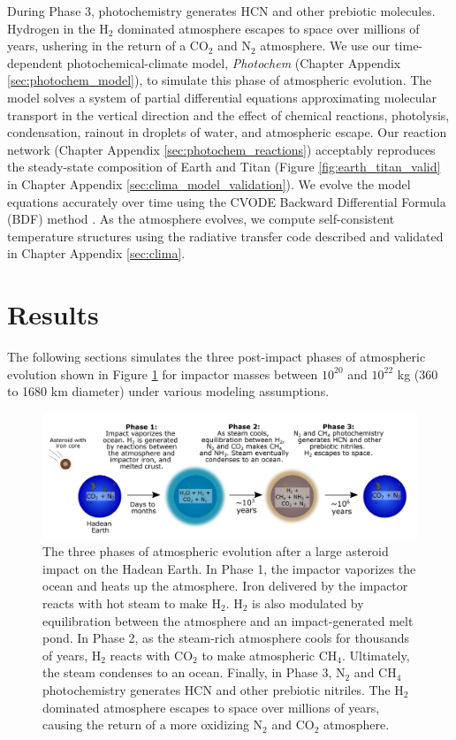 During Phase 3, photochemistry generates HCN and other prebiotic molecules. Hydrogen in the H$_2$ dominated atmosphere escapes to space over millions of years, ushering in the return of a CO$_2$ and N$_2$ atmosphere. We use our time-dependent photochemical-climate model, \emph{Photochem} (Chapter Appendix \ref{sec:photochem_model}), to simulate this phase of atmospheric evolution. The model solves a system of partial differential equations approximating molecular transport in the vertical direction and the effect of chemical reactions, photolysis, condensation, rainout in droplets of water, and atmospheric escape. Our reaction network (Chapter Appendix \ref{sec:photochem_reactions}) acceptably reproduces the steady-state composition of Earth and Titan (Figure \ref{fig:earth_titan_valid} in Chapter Appendix \ref{sec:clima_model_validation}). We evolve the model equations accurately over time using the CVODE Backward Differential Formula (BDF) method \citep{Hindmarsh_2005}. As the atmosphere evolves, we compute self-consistent temperature structures using the radiative transfer code described and validated in Chapter Appendix \ref{sec:clima}.

\section{Results}

The following sections simulates the three post-impact phases of atmospheric evolution shown in Figure \ref{fig:impact_diagram} for impactor masses between $10^{20}$ and $10^{22}$ kg (360 to 1680 km diameter) under various modeling assumptions.

\begin{figure}
  \centering
  \includegraphics[width=1.0\textwidth]{tex/5impacts/figures/impact_diagram.pdf}
  \caption{The three phases of atmospheric evolution after a large asteroid impact on the Hadean Earth. In Phase 1, the impactor vaporizes the ocean and heats up the atmosphere. Iron delivered by the impactor reacts with hot steam to make H$_2$. H$_2$ is also modulated by equilibration between the atmosphere and an impact-generated melt pond. In Phase 2, as the steam-rich atmosphere cools for thousands of years, H$_2$ reacts with CO$_2$ to make atmospheric CH$_4$. Ultimately, the steam condenses to an ocean. Finally, in Phase 3, N$_2$ and CH$_4$ photochemistry generates HCN and other prebiotic nitriles. The H$_2$ dominated atmosphere escapes to space over millions of years, causing the return of a more oxidizing N$_2$ and CO$_2$ atmosphere.}
  \label{fig:impact_diagram}
\end{figure}

